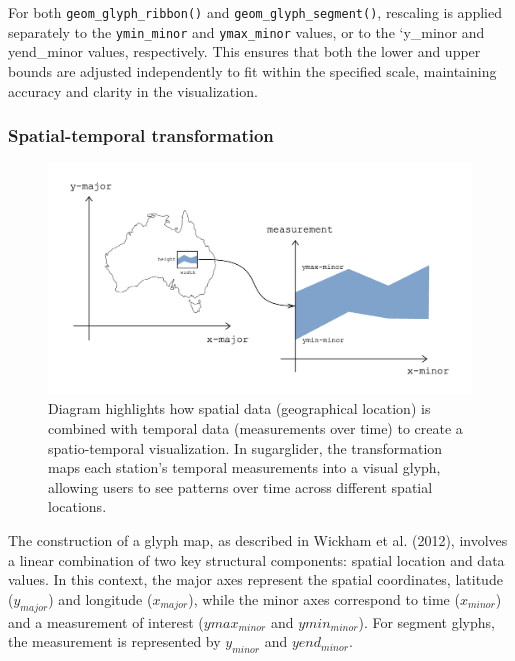 For both \texttt{geom\_glyph\_ribbon()} and \texttt{geom\_glyph\_segment()}, rescaling is applied separately to the \texttt{ymin\_minor} and \texttt{ymax\_minor} values, or to the `y\_minor and yend\_minor values, respectively. This ensures that both the lower and upper bounds are adjusted independently to fit within the specified scale, maintaining accuracy and clarity in the visualization.

\hypertarget{spatial-temporal-transformation}{%
\subsubsection{Spatial-temporal transformation}\label{spatial-temporal-transformation}}

\begin{figure}
\includegraphics[width=17.71in]{figures/diagram-transformation} \caption{Diagram highlights how spatial data (geographical location) is combined with temporal data (measurements over time) to create a spatio-temporal visualization. In sugarglider, the transformation maps each station's temporal measurements into a visual glyph, allowing users to see patterns over time across different spatial locations.}\label{fig:unnamed-chunk-7}
\end{figure}

The construction of a glyph map, as described in Wickham et al. (2012), involves a linear combination of two key structural components: spatial location and data values. In this context, the major axes represent the spatial coordinates, latitude (\(y_{major}\)) and longitude (\(x_{major}\)), while the minor axes correspond to time (\(x_{minor}\)) and a measurement of interest (\(ymax_{minor}\) and \(ymin_{minor}\)). For segment glyphs, the measurement is represented by \(y_{minor}\) and \(yend_{minor}\).

